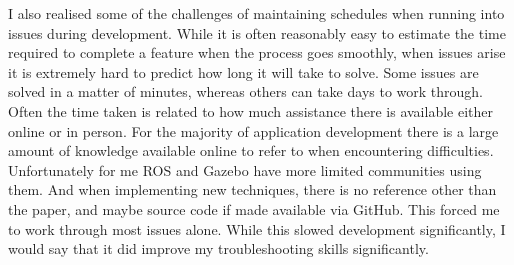 \documentclass[]{../resources/final_report}
\begin{document}
I also realised some of the challenges of maintaining schedules when running into issues during development. While it is often reasonably easy to estimate the time required to complete a feature when the process goes smoothly, when issues arise it is extremely hard to predict how long it will take to solve. Some issues are solved in a matter of minutes, whereas others can take days to work through. Often the time taken is related to how much assistance there is available either online or in person. For the majority of application development there is a large amount of knowledge available online to refer to when encountering difficulties. Unfortunately for me ROS and Gazebo have more limited communities using them. And when implementing new techniques, there is no reference other than the paper, and maybe source code if made available via GitHub. This forced me to work through most issues alone. While this slowed development significantly, I would say that it did improve my troubleshooting skills significantly.


\newpage



\label{endpage}
\end{document}
